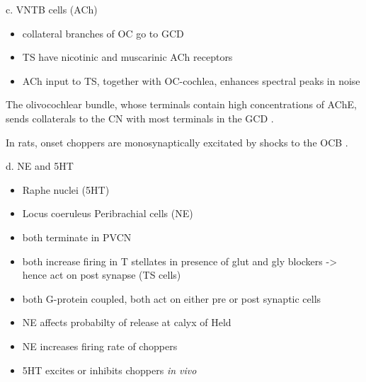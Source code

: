 c. VNTB cells (ACh)

\begin{itemize}
\item collateral branches of OC go to GCD \citep{MellottMottsEtAl:2011,SherriffHenderson:1994,OsenRoth:1969}
\item TS have nicotinic and muscarinic ACh receptors \citep{FujinoOertel:2001}
\item ACh input to TS, together with OC-cochlea, enhances spectral peaks in noise  \citep{FujinoOertel:2001}
\end{itemize}

The olivocochlear bundle, whose terminals contain high concentrations of AChE, sends collaterals to the CN with most terminals in the GCD \citep{MellottMottsEtAl:2011,SherriffHenderson:1994,OsenRoth:1969}. %

In rats, onset choppers are monosynaptically excitated by shocks to the OCB \citep{MuldersPaoliniEtAl:2003,MuldersWinterEtAl:2002,MuldersPaoliniEtAl:2009}.



d. NE and 5HT

\begin{itemize}
\item Raphe nuclei (5HT)
\item Locus coeruleus Peribrachial cells (NE)
\item both terminate in PVCN \citep{KlepperHerbert:1991,Thompson:2003,ThompsonLauder:2005,Thompson:2003a,ThompsonWiechmann:2002,BehrensSchofieldEtAl:2002,ThompsonThompson:2001,ThompsonThompson:2001a,ThompsonMooreEtAl:1995,ThompsonThompsonEtAl:1994}
\item both increase firing in T stellates \citep{OertelWrightEtAl:2010} in presence of glut and gly blockers -> hence act on post synapse (TS cells)
\item both G-protein coupled, both act on either pre or post synaptic cells
\item NE affects probabilty of release at calyx of Held
\item NE increases firing rate of choppers \citep{KosslVater:1989,Ebert:1996}
\item 5HT excites or inhibits choppers \emph{in vivo} \citep{EbertOstwald:1992}
\end{itemize}




